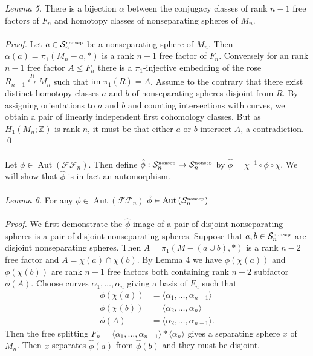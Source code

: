 \documentclass[11pt]{article}
\newcommand{\Z}{\mathbb{Z}}
\newcommand{\Aut}[1]{\ensuremath{ \aaut \left (#1 \right ) }}
\newcommand{\nosep}{{\ensuremath{ \mathcal S^{\mbox{\tiny{nonsep}}}_n }}}
\newcommand{\ffn}{{\ensuremath{ \mathcal {FF}_n }}}
\DeclareMathOperator{\aaut}{Aut}
\begin{document}
\noindent \emph{Lemma 5.} There is a bijection $\alpha$ between the conjugacy classes of rank $n-1$ free factors of $F_n$ and homotopy classes of nonseparating spheres of $M_n$.\\
\\
\noindent \emph{Proof.}
Let $a \in \nosep$ be a nonseparating sphere of $M_n$.
Then $\alpha(a)=\pi_1 (M_n-a,\ast)$ is a rank $n-1$ free factor of $F_n$.
Conversely for an rank $n-1$ free factor $A \leq F_n$ there is a $\pi_1$-injective embedding of the rose $R_{n-1} \stackrel{R}\hookrightarrow M_n$ such that $\mbox{im } \pi_1(R) = A$. 
Assume to the contrary that there exist distinct homotopy classes $a$ and $b$ of nonseparating spheres disjoint from $R$.
By assigning orientations to $a$ and $b$ and counting intersections with curves, we obtain a pair of linearly independent first cohomology classes. But as $H_1(M_n;\Z)$ is rank $n$, it must be that either $a$ or $b$ intersect $A$, a contradiction. \qed\\
\\
Let $\phi \in \Aut{\ffn}$. 
Then define $\hat \phi:\nosep \to \nosep$  by $\hat \phi= \chi^{-1} \circ \phi \circ \chi$. We will show that $\hat \phi$ is in fact an automorphism.\\
\\
\noindent \emph{Lemma 6.} For any $\phi \in \aaut (\ffn )$  $\hat \phi \in \aaut \left ( \nosep \right )$\\
\\
\noindent \emph{Proof.}
We first demonstrate the $\hat \phi$ image of a pair of disjoint nonseparating spheres is a pair of disjoint nonseparating spheres.
Suppose that $a,b \in \nosep$ are disjoint nonseparating spheres. Then $A=\pi_1 \left (M-(a\cup b),\ast \right )$ is a rank $n-2$ free factor and $A =\chi(a) \cap \chi(b)$.
By Lemma 4 we have $\phi (\chi (a))$ and $\phi (\chi (b))$ are rank $n-1$ free factors both containing rank $n-2$ subfactor $\phi(A)$.
Choose curves $\alpha_1, \ldots, \alpha_n$ giving a basis of $F_n$ such that 
\begin{align*}
\phi(\chi(a)) &=\langle \alpha_1, \ldots, \alpha_{n-1} \rangle\\
\phi(\chi(b)) &=\langle \alpha_2, \ldots, \alpha_{n} \rangle\\
\phi(A) &=\langle \alpha_2, \ldots, \alpha_{n-1} \rangle.
\end{align*}
Then the free splitting $F_n= \langle \alpha_1, \ldots, \alpha_{n-1} \rangle \ast \langle \alpha_{n} \rangle$ gives a separating sphere $x$ of $M_n$.
Then $x$ separates $\hat \phi (a)$ from $\hat \phi (b)$ and they must be disjoint. 
\end{document}
